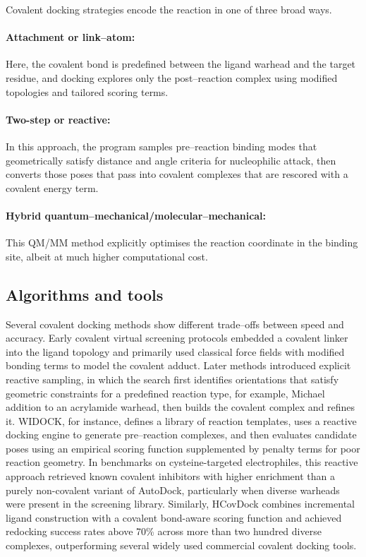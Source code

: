 \documentclass[12pt]{article}
\begin{document}
 Covalent docking\cite{CH14_CovalentDockingReview2015,CH14_CovalentToolSelection2019} strategies encode the reaction in one of three broad ways.  
 \paragraph{Attachment or link–atom:} Here, the covalent bond is predefined between the ligand warhead and the target residue, and docking explores only the post–reaction complex using modified topologies and tailored scoring terms. 
 
 \paragraph{Two-step or reactive:} In this approach, the program samples pre–reaction binding modes that geometrically satisfy distance and angle criteria for nucleophilic attack, then converts those poses that pass into covalent complexes that are rescored with a covalent energy term.  
 
 \paragraph{Hybrid quantum–mechanical/molecular–mechanical:} This QM/MM method explicitly optimises the reaction coordinate in the binding site, albeit at much higher computational cost.


\subsection{Algorithms and tools}

Several covalent docking methods show different trade–offs between speed and accuracy.  Early covalent virtual screening protocols embedded a covalent linker into the ligand topology and primarily used classical force fields with modified bonding terms to model the covalent adduct. Later methods introduced explicit reactive sampling, in which the search first identifies orientations that satisfy geometric constraints for a predefined reaction type, for example, Michael addition to an acrylamide warhead, then builds the covalent complex and refines it\cite{CH14_CovalentLargeLibraries2014}. WIDOCK\cite{CH14_WIDOCK2021}, for instance, defines a library of reaction templates, uses a reactive docking engine to generate pre–reaction complexes, and then evaluates candidate poses using an empirical scoring function supplemented by penalty terms for poor reaction geometry. In benchmarks on cysteine-targeted electrophiles, this reactive approach retrieved known covalent inhibitors with higher enrichment than a purely non-covalent variant of AutoDock, particularly when diverse warheads were present in the screening library.  Similarly, HCovDock\cite{CH14_HCovDock2023} combines incremental ligand construction with a covalent bond-aware scoring function and achieved redocking success rates above 70\% across more than two hundred diverse complexes, outperforming several widely used commercial covalent docking tools.
\end{document}
